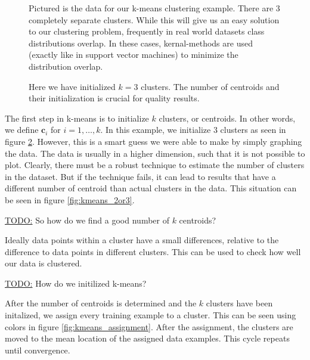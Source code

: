\documentclass[11pt]{article}
\begin{document}
\begin{minipage}{0.47\linewidth}
  \begin{figure}[H]
    \centering
    
    \caption{Pictured is the data for our k-means clustering example. There are $3$ completely separate clusters. While this will give us an easy solution to our clustering problem, frequently in real world datasets class distributions overlap. In these cases, kernal-methods are used (exactly like in support vector machines) to minimize the distribution overlap.}
    \label{fig:kmeans_data}
  \end{figure}
\end{minipage}\hfill
\begin{minipage}{0.47\linewidth}
  \begin{figure}[H]
    \centering
    
    \caption{Here we have initialized $k = 3$ clusters. The number of centroids and their initialization is crucial for quality results.}
    \label{fig:kmeans_init}
  \end{figure}
\end{minipage}\vspace{0.5cm}

The first step in k-means is to initialize $k$ clusters, or centroids. In other words, we define $\mathbf{c}_{i}$ for $i = 1,\ldots,k$. In this example, we initialize $3$ clusters as seen in figure \ref{fig:kmeans_init}. However, this is a smart guess we were able to make by simply graphing the data. The data is usually in a higher dimension, such that it is not possible to plot. Clearly, there must be a robust technique to estimate the number of clusters in the dataset. But if the technique fails, it can lead to results that have a different number of centroid than actual clusters in the data. This situation can be seen in figure \ref{fig:kmeans_2or3}.

\underline{TODO:} So how do we find a good number of $k$ centroids?

Ideally data points within a cluster have a small differences, relative to the difference to data points in different clusters. This can be used to check how well our data is clustered. 

\underline{TODO:} How do we initilized k-means?

After the number of centroids is determined and the $k$ clusters have been initalized, we assign every training example to a cluster. This can be seen using colors in figure \ref{fig:kmeans_assignment}. After the assignment, the clusters are moved to the mean location of the assigned data examples. This cycle repeats until convergence.
\end{document}
